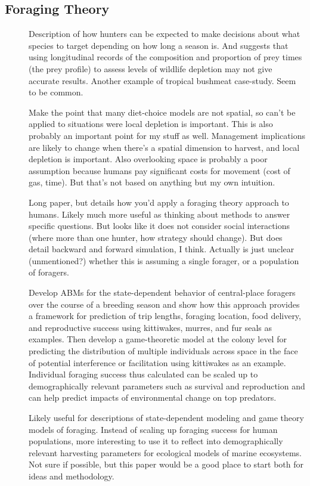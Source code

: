 \documentclass[a4paper,10pt]{report}
\begin{document}
\subsection{Foraging Theory}
\begin{description}
\item[\cite{Levietal:2011}] Description of how hunters can be expected to make decisions about what species to target depending on how long a season is. And suggests that using longitudinal records of the composition and proportion of prey times (the prey profile) to assess levels of wildlife depletion may not give accurate results. Another example of tropical bushmeat case-study. Seem to be common. 

Make the point that many diet-choice models are not spatial, so can't be applied to situations were local depletion is important. This is also probably an important point for my stuff as well. Management implications are likely to change when there's a spatial dimension to harvest, and local depletion is important. Also overlooking space is probably a poor assumption because humans pay significant costs for movement (cost of gas, time). But that's not based on anything but my own intuition. 

Long paper, but details how you'd apply a foraging theory approach to humans. Likely much more useful as thinking about methods to answer specific questions. But looks like it does not consider social interactions (where more than one hunter, how strategy should change). But does detail backward and forward simulation, I think. Actually is just unclear (unmentioned?) whether this is assuming a single forager, or a population of foragers. 

\item[\cite{SatterthwaiteMangel:2012}] Develop ABMs for the state-dependent behavior of central-place foragers over the course of a breeding season and show how this approach provides a framework for prediction of trip lengths, foraging location, food delivery, and reproductive success using kittiwakes, murres, and fur seals as examples. Then develop a game-theoretic model at the colony level for predicting the distribution of multiple individuals across space in the face of potential interference or facilitation using kittiwakes as an example. Individual foraging success thus calculated can be scaled up to demographically relevant parameters such as survival and reproduction and can help predict impacts of environmental change on top predators. 

Likely useful for descriptions of state-dependent modeling and game theory models of foraging. Instead of scaling up foraging success for human populations, more interesting to use it to reflect into demographically relevant harvesting parameters for ecological models of marine ecosystems. Not sure if possible, but this paper would be a good place to start both for ideas and methodology. 


\end{description}
\end{document}
